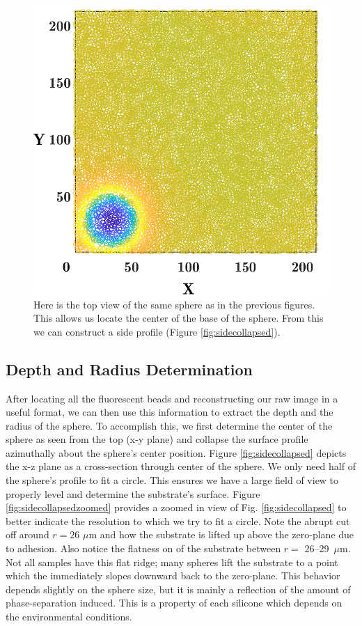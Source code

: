 \begin{figure}[h]
	\centering
	\includegraphics[width=.8\linewidth]{Chapters/Figures/sphere011_ia/particle_located_top_view}
	\caption[Particle Located: Top View]{Here is the top view of the same sphere as in the previous figures. This allows us locate the center of the base of the sphere. From this we can construct a side profile (Figure \ref{fig:sidecollapsed}).}
	\label{fig:particlelocatedtopview}
\end{figure}
\subsection{Depth and Radius Determination}
After locating all the fluorescent beads and reconstructing our raw image in a useful format, we can then use this information to extract the depth and the radius of the sphere. To accomplish this, we first determine the center of the sphere as seen from the top (x-y plane) and collapse the surface profile azimuthally about the sphere's center position. Figure \ref{fig:sidecollapsed} depicts the x-z plane as a cross-section through center of the sphere. We only need half of the sphere's profile to fit a circle. This ensures we have a large field of view to properly level and determine the substrate's surface. Figure \ref{fig:sidecollapsedzoomed} provides a zoomed in view of Fig. \ref{fig:sidecollapsed} to better indicate the resolution to which we try to fit a circle. Note the abrupt cut off around $r = 26$ $ \mu$m and how the substrate is lifted up above the zero-plane due to adhesion. Also notice the flatness on of the substrate between $r=$ 26--29~$\mu $m. Not all samples have this flat ridge; many spheres lift the substrate to a point which the immediately slopes downward back to the zero-plane. This behavior depends slightly on the sphere size, but it is mainly a reflection of the amount of phase-separation induced. This is a property of each silicone which depends on the environmental conditions. 



